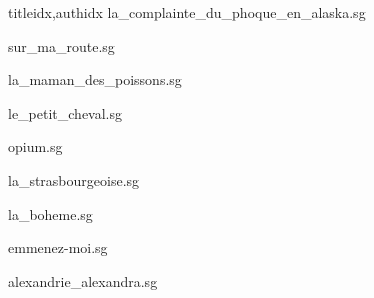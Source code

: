 \documentclass[12pt]{article}
\begin{document}
\begin{songs}{titleidx,authidx}
{la_complainte_du_phoque_en_alaska.sg}


{sur_ma_route.sg}


{la_maman_des_poissons.sg}


{le_petit_cheval.sg}


{opium.sg}


{la_strasbourgeoise.sg}


{la_boheme.sg}


{emmenez-moi.sg}


{alexandrie_alexandra.sg}



\end{songs}
\end{document}
